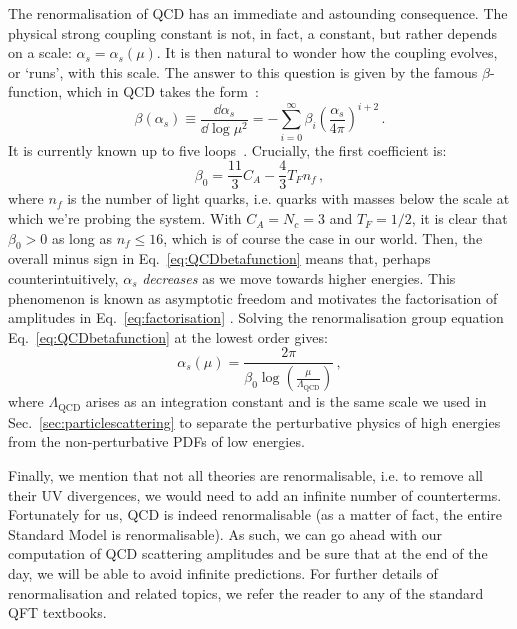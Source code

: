 \documentclass[main.tex]{subfiles}
\begin{document}
The renormalisation of QCD has an immediate and astounding consequence. The physical strong coupling constant is not, in fact, a constant, but rather depends on a scale: $\alpha_s = \alpha_s(\mu)$. 
It is then natural to wonder how the coupling evolves, or `runs', with this scale. The answer to this question is given by the famous $\beta$-function, which in QCD takes the form~\cite{PhysRevD.2.1541, Symanzik:1970rt}:
\begin{equation} \label{eq:QCDbetafunction}
    \beta(\alpha_s) \equiv \frac{\dd \alpha_s}{\dd \log \mu^2} = - \sum_{i=0}^\infty \beta_i \left (\frac{\alpha_s}{4\pi} \right)^{i+2}\,.
\end{equation}
It is currently known up to five loops~\cite{Baikov:2016tgj}. Crucially, the first coefficient is:
\begin{equation}
    \beta_0 = \frac{11}{3} C_A - \frac{4}{3} T_F n_f\,,
\end{equation}
where $n_f$ is the number of light quarks, i.e. quarks with masses below the scale at which we're probing the system. With $C_A = N_c = 3$ and $T_F = 1/2$, it is clear that $\beta_0>0$ as long as $n_f\le 16$, which is of course the case in our world. Then, the overall minus sign in Eq.~\ref{eq:QCDbetafunction} means that, perhaps counterintuitively, $\alpha_s$ \textit{decreases} as we move towards higher energies. This phenomenon is known as asymptotic freedom and motivates the factorisation of amplitudes in Eq.~\ref{eq:factorisation} . Solving the renormalisation group equation Eq.~\ref{eq:QCDbetafunction} at the lowest order gives:
\begin{equation}
    \alpha_s(\mu) = \frac{2\pi}{\beta_0 \log \left(\frac{\mu}{\Lambda_\text{QCD}}\right)}\,,
\end{equation}
where $\Lambda_\text{QCD}$ arises as an integration constant and is the same scale we used in Sec.~\ref{sec:particlescattering} to separate the perturbative physics of high energies from the non-perturbative PDFs of low energies. 

Finally, we mention that not all theories are renormalisable, i.e. to remove all their UV divergences, we would need to add an infinite number of counterterms. Fortunately for us, QCD is indeed renormalisable (as a matter of fact, the entire Standard Model is renormalisable). As such, we can go ahead with our computation of QCD scattering amplitudes and be sure that at the end of the day, we will be able to avoid infinite predictions. For further details of renormalisation and related topics, we refer the reader to any of the standard QFT textbooks.
\end{document}
